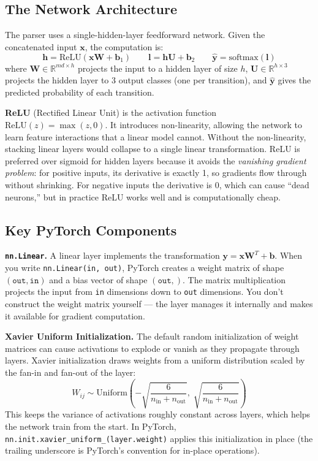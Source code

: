 \documentclass[11pt]{article}
\begin{document}
\subsection{The Network Architecture}

The parser uses a single-hidden-layer feedforward network. Given the concatenated input $\mathbf{x}$, the computation is:
\[
\mathbf{h} = \text{ReLU}(\mathbf{x}\mathbf{W} + \mathbf{b}_1) \qquad \mathbf{l} = \mathbf{h}\mathbf{U} + \mathbf{b}_2 \qquad \hat{\mathbf{y}} = \text{softmax}(\mathbf{l})
\]
where $\mathbf{W} \in \mathbb{R}^{md \times h}$ projects the input to a hidden layer of size $h$, $\mathbf{U} \in \mathbb{R}^{h \times 3}$ projects the hidden layer to 3 output classes (one per transition), and $\hat{\mathbf{y}}$ gives the predicted probability of each transition.

\textbf{ReLU} (Rectified Linear Unit) is the activation function $\text{ReLU}(z) = \max(z, 0)$. It introduces non-linearity, allowing the network to learn feature interactions that a linear model cannot. Without the non-linearity, stacking linear layers would collapse to a single linear transformation. ReLU is preferred over sigmoid for hidden layers because it avoids the \textit{vanishing gradient problem}: for positive inputs, its derivative is exactly 1, so gradients flow through without shrinking. For negative inputs the derivative is 0, which can cause ``dead neurons,'' but in practice ReLU works well and is computationally cheap.

\subsection{Key PyTorch Components}

\textbf{\texttt{nn.Linear}.} A linear layer implements the transformation $\mathbf{y} = \mathbf{x}\mathbf{W}^T + \mathbf{b}$. When you write \texttt{nn.Linear(in, out)}, PyTorch creates a weight matrix of shape $(\texttt{out}, \texttt{in})$ and a bias vector of shape $(\texttt{out},)$. The matrix multiplication projects the input from \texttt{in} dimensions down to \texttt{out} dimensions. You don't construct the weight matrix yourself --- the layer manages it internally and makes it available for gradient computation.

\textbf{Xavier Uniform Initialization.} The default random initialization of weight matrices can cause activations to explode or vanish as they propagate through layers. Xavier initialization draws weights from a uniform distribution scaled by the fan-in and fan-out of the layer:
\[
W_{ij} \sim \text{Uniform}\!\left(-\sqrt{\frac{6}{n_{\text{in}} + n_{\text{out}}}},\; \sqrt{\frac{6}{n_{\text{in}} + n_{\text{out}}}}\right)
\]
This keeps the variance of activations roughly constant across layers, which helps the network train from the start. In PyTorch, \texttt{nn.init.xavier\_uniform\_(layer.weight)} applies this initialization in place (the trailing underscore is PyTorch's convention for in-place operations).
\end{document}
